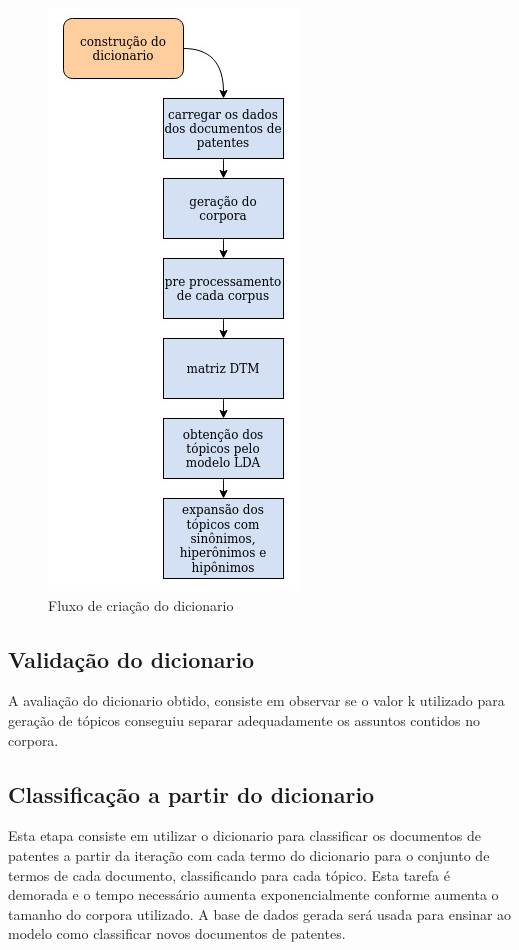 \begin{figure}[ht!]
	\centering
	\includegraphics[scale=0.5]{imagens/tcc_dicionario.jpg}
	\caption{Fluxo de criação do dicionario
			 \label{dicionario_flow_image}}
\end{figure}

\subsection{Validação do dicionario}
A avaliação do dicionario obtido, consiste em observar se o valor k utilizado para geração de tópicos conseguiu separar adequadamente os assuntos contidos no corpora.

\subsection{Classificação a partir do dicionario}
Esta etapa consiste em utilizar o dicionario para classificar os documentos de patentes a partir da iteração com cada termo do dicionario para o conjunto de termos de cada documento, classificando para cada tópico. Esta tarefa é demorada e o tempo necessário aumenta exponencialmente conforme aumenta o tamanho do corpora utilizado. A base de dados gerada será usada para ensinar ao modelo como classificar novos documentos de patentes.


